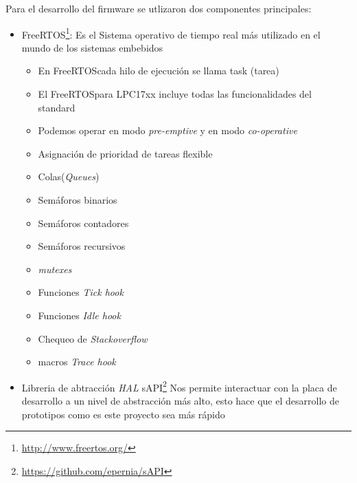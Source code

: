 \documentclass[10pt]{article}
\begin{document}
Para el desarrollo del firmware se utlizaron dos componentes principales:
\begin{itemize}
   \item FreeRTOS\texttrademark\footnote{\url{http://www.freertos.org/}}: Es el Sistema operativo de tiempo real más utilizado en el mundo de los sistemas embebidos 
      \begin{itemize}
         \item En FreeRTOS\texttrademark cada hilo de ejecución se llama task (tarea)
         \item El FreeRTOS\texttrademark para LPC17xx incluye todas las funcionalidades del standard
         \item Podemos operar en modo \textit{pre-emptive} y en modo \textit{co-operative}
         \item Asignación de prioridad de tareas flexible
         \item Colas(\textit{Queues})
         \item Semáforos binarios
         \item Semáforos contadores
         \item Semáforos recursivos
         \item \textit{mutexes}
         \item Funciones \textit{Tick hook}
         \item Funciones \textit{Idle hook}
         \item Chequeo de \textit{Stackoverflow}
         \item macros \textit{Trace hook}
      \end{itemize}
   \item Libreria de abtracción \textit{HAL} sAPI\footnote{\url{https://github.com/epernia/sAPI}} Nos permite interactuar con la placa de desarrollo a un nivel de abstracción más alto, esto hace que el desarrollo de prototipos como es este proyecto sea más rápido
\end{itemize}
\end{document}
